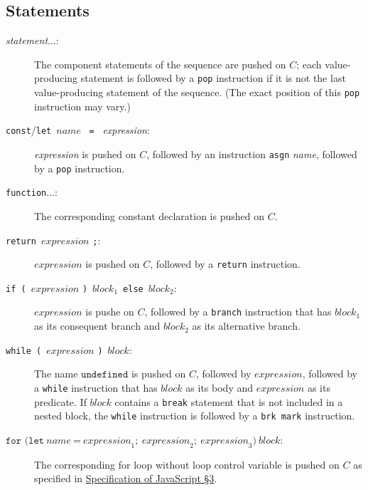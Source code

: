 \subsection*{Statements}

\begin{description}

\item[\textit{statement}$\ldots$:] The component statements of the sequence
are pushed on $C$; each
value-producing statement is followed by a \texttt{pop} instruction if it is not
the last value-producing statement of the sequence. (The exact position of this
\texttt{pop} instruction may vary.)

\item[\texttt{const}/\texttt{let}\ $\textit{name}$ \ \texttt{=} \ \textit{expression}:]
\textit{expression} is pushed on $C$, followed by an instruction \texttt{asgn} \textit{name},
followed by a \texttt{pop} instruction.

\item[\texttt{function}...:]
The corresponding constant declaration is pushed on $C$.

\item[\texttt{return}\ $\textit{expression}$ \texttt{;}:]
$\textit{expression}$ is pushed on $C$, followed by a \texttt{return} instruction.

\item[\texttt{if (}\ $\textit{expression}$ \texttt{)}\ $\textit{block}_1$\
\texttt{else}\ $\textit{block}_2$:]
$\textit{expression}$ is pushe on $C$, followed by a \texttt{branch} instruction
that has
$\textit{block}_1$ as its consequent branch and 
$\textit{block}_2$ as its alternative branch.

\item[\texttt{while (}\ $\textit{expression}$ \texttt{)}\ $\textit{block}$:]
The name $\texttt{undefined}$ is pushed on $C$, followed by
$\textit{expression}$, 
followed by a \texttt{while} instruction
that has
$\textit{block}$ as its body and $\textit{expression}$ as its predicate.
If $\textit{block}$ contains a \texttt{break}
statement that is not included in a nested block, the \texttt{while} instruction
is followed by a \texttt{brk mark} instruction.

\item[$\texttt{for (}\texttt{let}\ \textit{name} \ \texttt{=} \ \textit{expression}_1;\ \textit{expression}_2;\ \textit{expression}_3\texttt{)}\ \textit{block}$:]
The corresponding for loop without
loop control variable is pushed on $C$ as specified in
\href{https://docs.sourceacademy.org/javascript/javascript_3.pdf}{\color{blue}Specification of JavaScript \S 3}.


\end{description}
